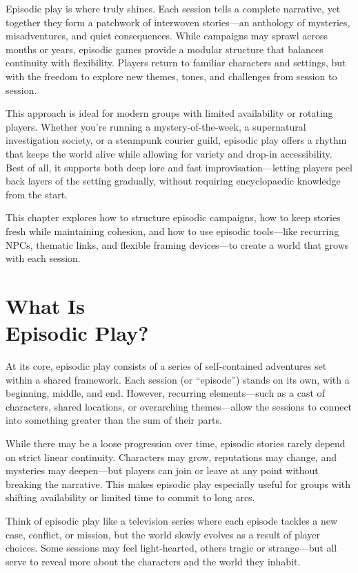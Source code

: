 Episodic play is where \wyrd truly shines. Each session tells a complete narrative, yet together they form a patchwork of interwoven stories—an anthology of mysteries, misadventures, and quiet consequences. While campaigns may sprawl across months or years, episodic games provide a modular structure that balances continuity with flexibility. Players return to familiar characters and settings, but with the freedom to explore new themes, tones, and challenges from session to session.

This approach is ideal for modern groups with limited availability or rotating players. Whether you're running a mystery-of-the-week, a supernatural investigation society, or a steampunk courier guild, episodic play offers a rhythm that keeps the world alive while allowing for variety and drop-in accessibility. Best of all, it supports both deep lore and fast improvisation—letting players peel back layers of the setting gradually, without requiring encyclopaedic knowledge from the start.

This chapter explores how to structure episodic campaigns, how to keep stories fresh while maintaining cohesion, and how to use episodic tools—like recurring NPCs, thematic links, and flexible framing devices—to create a world that grows with each session.

\section[What Is Episodic Play?]{What Is\\ Episodic Play?}

At its core, episodic play consists of a series of self-contained adventures set within a shared framework. Each session (or “episode”) stands on its own, with a beginning, middle, and end. However, recurring elements—such as a cast of characters, shared locations, or overarching themes—allow the sessions to connect into something greater than the sum of their parts.

While there may be a loose progression over time, episodic stories rarely depend on strict linear continuity. Characters may grow, reputations may change, and mysteries may deepen—but players can join or leave at any point without breaking the narrative. This makes episodic play especially useful for groups with shifting availability or limited time to commit to long arcs.

Think of episodic play like a television series where each episode tackles a new case, conflict, or mission, but the world slowly evolves as a result of player choices. Some sessions may feel light-hearted, others tragic or strange—but all serve to reveal more about the characters and the world they inhabit.

